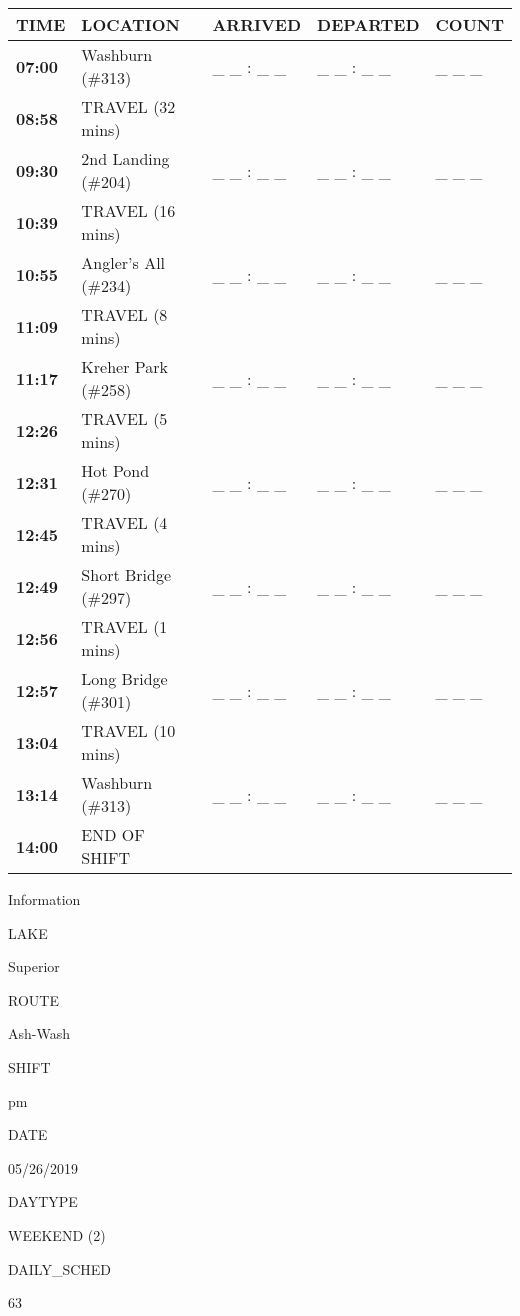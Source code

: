\documentclass[]{article}
\begin{document}
\begin{tabular}{>{\bfseries}lllll}
\toprule
\textbf{TIME} & \textbf{LOCATION} & \textbf{ARRIVED} & \textbf{DEPARTED} & \textbf{COUNT}\\
\midrule
07:00 & Washburn (\#313) & \_ \_ : \_ \_ & \_ \_ : \_ \_ & \_ \_ \_\\
08:58 & TRAVEL (32 mins) &  &  & \\
09:30 & 2nd Landing (\#204) & \_ \_ : \_ \_ & \_ \_ : \_ \_ & \_ \_ \_\\
10:39 & TRAVEL (16 mins) &  &  & \\
10:55 & Angler's All (\#234) & \_ \_ : \_ \_ & \_ \_ : \_ \_ & \_ \_ \_\\
11:09 & TRAVEL (8 mins) &  &  & \\
11:17 & Kreher Park (\#258) & \_ \_ : \_ \_ & \_ \_ : \_ \_ & \_ \_ \_\\
12:26 & TRAVEL (5 mins) &  &  & \\
12:31 & Hot Pond (\#270) & \_ \_ : \_ \_ & \_ \_ : \_ \_ & \_ \_ \_\\
12:45 & TRAVEL (4 mins) &  &  & \\
12:49 & Short Bridge (\#297) & \_ \_ : \_ \_ & \_ \_ : \_ \_ & \_ \_ \_\\
12:56 & TRAVEL (1 mins) &  &  & \\
12:57 & Long Bridge (\#301) & \_ \_ : \_ \_ & \_ \_ : \_ \_ & \_ \_ \_\\
13:04 & TRAVEL (10 mins) &  &  & \\
13:14 & Washburn (\#313) & \_ \_ : \_ \_ & \_ \_ : \_ \_ & \_ \_ \_\\
14:00 & END OF SHIFT &  &  & \\
\bottomrule
\end{tabular}\newpage

Information

LAKE

Superior

ROUTE

Ash-Wash

SHIFT

pm

DATE

05/26/2019

DAYTYPE

WEEKEND (2)

DAILY\_SCHED

63

\vspace{24pt}
\end{document}
